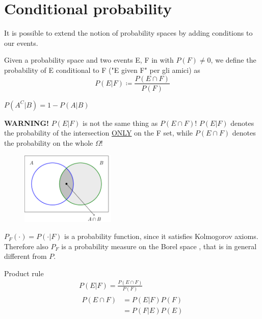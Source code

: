 \section{Conditional probability}
It is possible to extend the notion of probability spaces by adding conditions to our events.
\begin{definition}
    Given a probability space \probspace{} and two events E, F in \eff{} with $P(F) \neq 0$, we define the probability of E conditional to F ("E given F" per gli amici) as
    \begin{equation*}
        P(E|F) \coloneqq \frac{P(E \cap F)}{P(F)}
    \end{equation*}
\end{definition}
\begin{remark}
    $P(A^C|B)=1-P(A|B)$
\end{remark}
\textbf{WARNING!} $P(E|F)$ is not the same thing as $P(E \cap F)$! $P(E|F)$ denotes the probability of the intersection \underline{ONLY} on the F set, while $P(E \cap F)$ denotes the probability on the whole $\Omega$!
\begin{figure}[ht]
    \centering
    \includegraphics[width=0.4\textwidth]{images/conditional_b.png}
\end{figure}
\begin{remark}
    $P_F(\cdot) = P(\cdot{} | F) $ is a probability function, since it satisfies Kolmogorov axioms. Therefore also $P_F$ is a probability measure on the Borel space \borel, that is in general different from $P$.
\end{remark}
\begin{remark}
    Product rule
    \begin{equation*}
    \begin{gathered}
        P(E|F)=\frac{P(E \cap F)}{P(F)}\\
            \begin{aligned}
                P(E \cap F) & = P(E|F)P(F)\\
                & = P(F|E)P(E)
            \end{aligned}
    \end{gathered}
    \end{equation*}
\end{remark}
